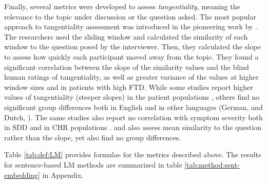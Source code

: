 Finally, several metrics were developed to assess \textit{tangentiality}, meaning the relevance to the topic under discussion or the question asked. The most popular approach to tangentiality assessment was introduced in the pioneering work by \citet{elvevaag2007quantifying}. The researchers used the sliding window and calculated the similarity of each window to the question posed by the interviewer. Then, they calculated the slope to assess how quickly each participant moved away from the topic. They found a significant correlation between the slope of the similarity values and the blind human ratings of tangentiality, as well as greater variance of the values at higher window sizes and in patients with high FTD.  While some studies report higher values of tangentiality (steeper slopes) in the patient populations \citep{iter2018automatic, tang2021natural}, others find no significant group differences both in English \citep{hitczenko2021understanding, morgan2021natural} and in other languages (German, \cite{koranova2017analyzing, just2019coherence} and Dutch, \cite{dore2019quantification}). The same studies also report no correlation with symptom severity both in SDD \citep{dore2019quantification} and in CHR populations \citep{hitczenko2021understanding, morgan2021natural}. \citet{koranova2017analyzing} and \citet{just2019coherence} also assess mean similarity to the question rather than the slope, yet also find no group differences.

Table \ref{tab:def:LM} provides formulae for the metrics described above. The results for sentence-based LM methods are summarized in table \ref{tab:method:sent-embedding} in Appendix.

